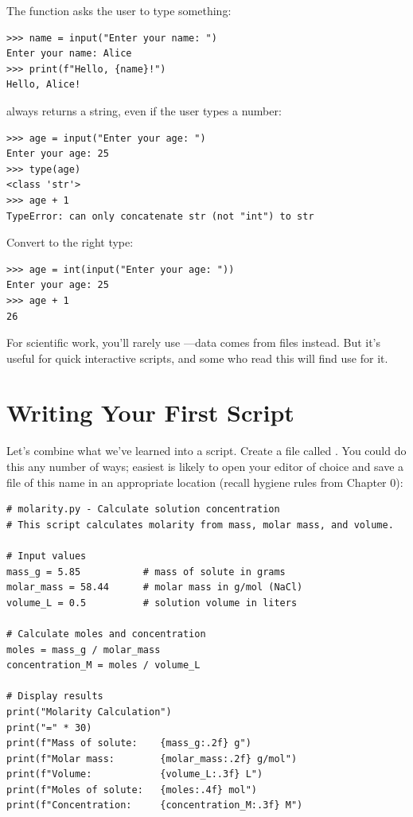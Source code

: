 The  function asks the user to type something:

\begin{lstlisting}
>>> name = input("Enter your name: ")
Enter your name: Alice
>>> print(f"Hello, {name}!")
Hello, Alice!
\end{lstlisting}

\begin{warning}
 always returns a string, even if the user types a number:
\begin{lstlisting}
>>> age = input("Enter your age: ")
Enter your age: 25
>>> type(age)
<class 'str'>
>>> age + 1
TypeError: can only concatenate str (not "int") to str
\end{lstlisting}
Convert to the right type:
\begin{lstlisting}
>>> age = int(input("Enter your age: "))
Enter your age: 25
>>> age + 1
26
\end{lstlisting}
\end{warning}

For scientific work, you'll rarely use ---data comes from files instead. But it's useful for quick interactive scripts, and some who read this will find use for it. 

\section{Writing Your First Script}
\label{sec:first-script}

Let's combine what we've learned into a script. Create a file called . You could do this any number of ways; easiest is likely to open your editor of choice and save a file of this name in an appropriate location (recall hygiene rules from Chapter 0):

\begin{lstlisting}
# molarity.py - Calculate solution concentration
# This script calculates molarity from mass, molar mass, and volume.

# Input values
mass_g = 5.85           # mass of solute in grams
molar_mass = 58.44      # molar mass in g/mol (NaCl)
volume_L = 0.5          # solution volume in liters

# Calculate moles and concentration
moles = mass_g / molar_mass
concentration_M = moles / volume_L

# Display results
print("Molarity Calculation")
print("=" * 30)
print(f"Mass of solute:    {mass_g:.2f} g")
print(f"Molar mass:        {molar_mass:.2f} g/mol")
print(f"Volume:            {volume_L:.3f} L")
print(f"Moles of solute:   {moles:.4f} mol")
print(f"Concentration:     {concentration_M:.3f} M")
\end{lstlisting}

